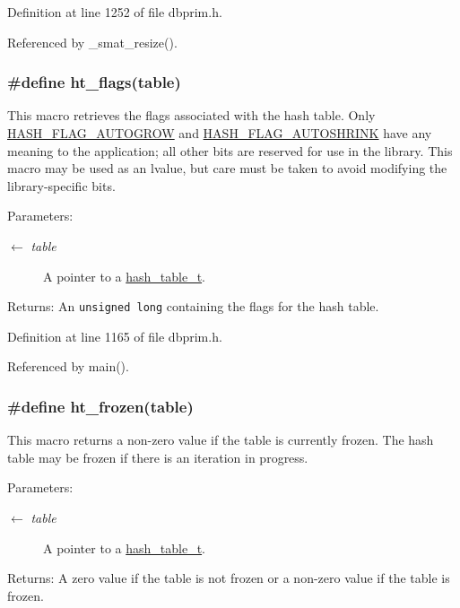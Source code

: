 Definition at line 1252 of file dbprim.h.

Referenced by \_\-smat\_\-resize().\hypertarget{group__dbprim__hash_ga27}{
\subsubsection[ht\_\-flags]{\setlength{\rightskip}{0pt plus 5cm}\#define ht\_\-flags(table)}}
\label{group__dbprim__hash_ga27}


This macro retrieves the flags associated with the hash table. Only \hyperlink{group__dbprim__hash_ga22}{HASH\_\-FLAG\_\-AUTOGROW} and \hyperlink{group__dbprim__hash_ga23}{HASH\_\-FLAG\_\-AUTOSHRINK} have any meaning to the application; all other bits are reserved for use in the library. This macro may be used as an lvalue, but care must be taken to avoid modifying the library-specific bits.

\begin{Desc}
\item[Parameters:]
\begin{description}
\item[\mbox{$\leftarrow$} {\em table}]A pointer to a \hyperlink{group__dbprim__hash_ga1}{hash\_\-table\_\-t}.\end{description}
\end{Desc}
\begin{Desc}
\item[Returns:]An {\tt unsigned long} containing the flags for the hash table.\end{Desc}


Definition at line 1165 of file dbprim.h.

Referenced by main().\hypertarget{group__dbprim__hash_ga28}{
\subsubsection[ht\_\-frozen]{\setlength{\rightskip}{0pt plus 5cm}\#define ht\_\-frozen(table)}}
\label{group__dbprim__hash_ga28}


This macro returns a non-zero value if the table is currently frozen. The hash table may be frozen if there is an iteration in progress.

\begin{Desc}
\item[Parameters:]
\begin{description}
\item[\mbox{$\leftarrow$} {\em table}]A pointer to a \hyperlink{group__dbprim__hash_ga1}{hash\_\-table\_\-t}.\end{description}
\end{Desc}
\begin{Desc}
\item[Returns:]A zero value if the table is not frozen or a non-zero value if the table is frozen.\end{Desc}


